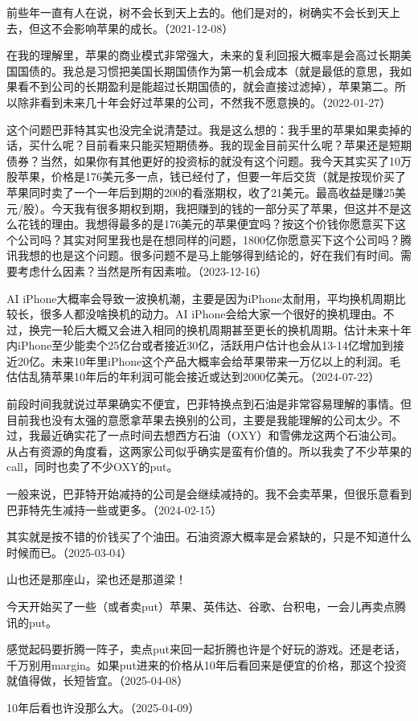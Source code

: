 前些年一直有人在说，树不会长到天上去的。他们是对的，树确实不会长到天上去，但这不会影响苹果的成长。（2021-12-08）

在我的理解里，苹果的商业模式非常强大，未来的复利回报大概率是会高过长期美国国债的。我总是习惯把美国长期国债作为第一机会成本（就是最低的意思，我如果看不到公司的长期盈利是能超过长期国债的，就会直接过滤掉），苹果第二。所以除非看到未来几十年会好过苹果的公司，不然我不愿意换的。（2022-01-27）


这个问题巴菲特其实也没完全说清楚过。我是这么想的：我手里的苹果如果卖掉的话，买什么呢？目前看来只能买短期债券。我的现金目前买什么呢？苹果还是短期债券？当然，如果你有其他更好的投资标的就没有这个问题。我今天其实买了10万股苹果，价格是176美元多一点，钱已经付了，但要一年后交货（就是按现价买了苹果同时卖了一个一年后到期的200的看涨期权，收了21美元。最高收益是赚25美元/股）。今天我有很多期权到期，我把赚到的钱的一部分买了苹果，但这并不是这么花钱的理由。我想得最多的是176美元的苹果便宜吗？按这个价钱你愿意买下这个公司吗？其实对阿里我也是在想同样的问题，1800亿你愿意买下这个公司吗？腾讯我想的也是这个问题。很多问题不是马上能够得到结论的，好在我们有时间。需要考虑什么因素？当然是所有因素啦。（2023-12-16）

AI iPhone大概率会导致一波换机潮，主要是因为iPhone太耐用，平均换机周期比较长，很多人都没啥换机的动力。AI iPhone会给大家一个很好的换机理由。不过，换完一轮后大概又会进入相同的换机周期甚至更长的换机周期。估计未来十年内iPhone至少能卖个25亿台或者接近30亿，活跃用户估计也会从13-14亿增加到接近20亿。未来10年里iPhone这个产品大概率会给苹果带来一万亿以上的利润。毛估估乱猜苹果10年后的年利润可能会接近或达到2000亿美元。（2024-07-22）

前段时间我就说过苹果确实不便宜，巴菲特换点到石油是非常容易理解的事情。但目前我也没有太强的意愿拿苹果去换别的公司，主要是我能理解的公司太少。不过，我最近确实花了一点时间去想西方石油（OXY）和雪佛龙这两个石油公司。从占有资源的角度看，这两家公司似乎确实是蛮有价值的。所以我卖了不少苹果的call，同时也卖了不少OXY的put。

一般来说，巴菲特开始减持的公司是会继续减持的。我不会卖苹果，但很乐意看到巴菲特先生减持一些或更多。（2024-02-15）


其实就是按不错的价钱买了个油田。石油资源大概率是会紧缺的，只是不知道什么时候而已。（2025-03-04）

山也还是那座山，梁也还是那道梁！

今天开始买了一些（或者卖put）苹果、英伟达、谷歌、台积电，一会儿再卖点腾讯的put。

感觉起码要折腾一阵子，卖点put来回一起折腾也许是个好玩的游戏。还是老话，千万别用margin。如果put进来的价格从10年后看回来是便宜的价格，那这个投资就值得做，长短皆宜。（2025-04-08）


10年后看也许没那么大。（2025-04-09）
